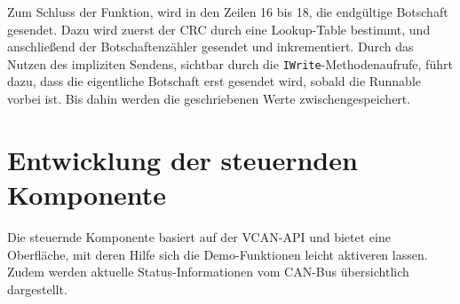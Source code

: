 \documentclass[
  a4paper,					    %
  twoside,
  DIV=calc,     				%
  bibliography=totoc,
  cleardoublepage=empty,
  ngerman,     					%
  final       					%
]{scrbook}
\begin{document}
Zum Schluss der Funktion, wird in den Zeilen 16 bis 18, die endgültige Botschaft gesendet. Dazu wird zuerst der CRC durch eine Lookup-Table bestimmt, und anschließend der Botschaftenzähler gesendet und inkrementiert. Durch das Nutzen des impliziten Sendens, sichtbar durch die \texttt{IWrite}-Methodenaufrufe, führt dazu, dass die eigentliche Botschaft erst gesendet wird, sobald die Runnable vorbei ist. Bis dahin werden die geschriebenen Werte zwischengespeichert.









\section{Entwicklung der steuernden Komponente}
\label{sec:entwicklung_vcan_app}
Die steuernde Komponente basiert auf der VCAN-API und bietet eine Oberfläche, mit deren Hilfe sich die Demo-Funktionen leicht aktiveren lassen. Zudem werden aktuelle Status-Informationen vom CAN-Bus übersichtlich dargestellt. 
\end{document}
